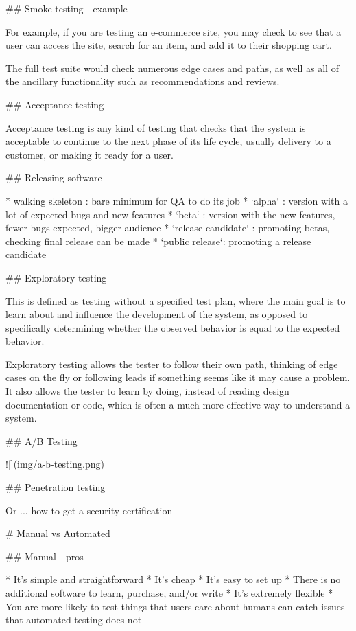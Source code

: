 ## Smoke testing - example

For example, if you are testing an e-commerce site, you
may check to see that a user can access the site, search
for an item, and add it to their shopping cart.

The full test suite would check numerous edge cases and
paths, as well as all of the ancillary functionality such as
recommendations and reviews.

## Acceptance testing

Acceptance testing is any kind of testing that checks
that the system is acceptable to continue to the next
phase of its life cycle, usually delivery to a
customer, or making it ready for a user.

## Releasing software

* walking skeleton : bare minimum for QA to do its job
* `alpha` : version with a lot of expected bugs and new features
* `beta` : version with the new features, fewer bugs expected, bigger audience
* `release candidate` : promoting betas, checking final release can be made
* `public release`: promoting a release candidate

## Exploratory testing

This is defined as testing without a specified test plan,
where the main goal is to learn about and influence the
development of the system, as opposed to specifically
determining whether the observed behavior is equal to
the expected behavior.

Exploratory testing allows the tester to follow their own
path, thinking of edge cases on the fly or following
leads if something seems like it may cause a problem. It
also allows the tester to learn by doing, instead of
reading design documentation or code, which is often a
much more effective way to understand a system.

## A/B Testing

![](img/a-b-testing.png)


## Penetration testing

Or ... how to get a security certification

# Manual vs Automated

## Manual - pros

* It’s simple and straightforward
* It’s cheap
* It’s easy to set up
* There is no additional software to learn, purchase,
  and/or write
* It’s extremely flexible
* You are more likely to test things that users care about
  humans can catch issues that automated testing does
  not

